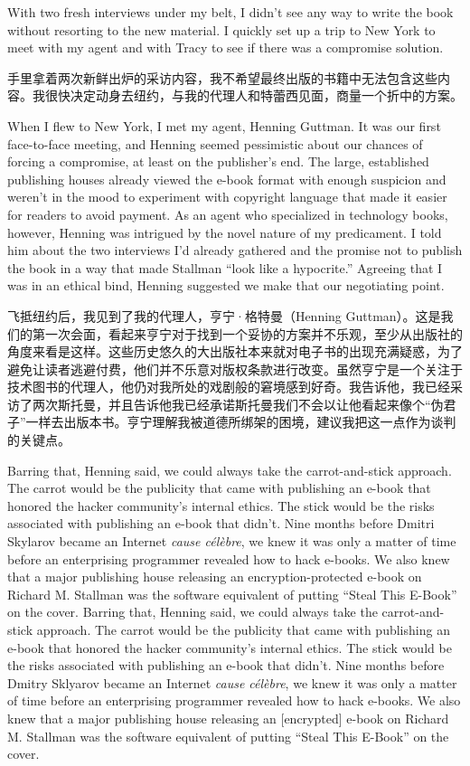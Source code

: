 \ifdefined\eng
With two fresh interviews under my belt, I didn't see any way to write the book without resorting to the new material. I quickly set up a trip to New York to meet with my agent and with Tracy to see if there was a compromise solution.
\fi

\ifdefined\chs
手里拿着两次新鲜出炉的采访内容，我不希望最终出版的书籍中无法包含这些内容。我很快决定动身去纽约，与我的代理人和特蕾西见面，商量一个折中的方案。
\fi

\ifdefined\eng
When I flew to New York, I met my agent, Henning Guttman. It was our first face-to-face meeting, and Henning seemed pessimistic about our chances of forcing a compromise, at least on the publisher's end. The large, established publishing houses already viewed the e-book format with enough suspicion and weren't in the mood to experiment with copyright language that made it easier for readers to avoid payment. As an agent who specialized in technology books, however, Henning was intrigued by the novel nature of my predicament. I told him about the two interviews I'd already gathered and the promise not to publish the book in a way that made Stallman ``look like a hypocrite.'' Agreeing that I was in an ethical bind, Henning suggested we make that our negotiating point.
\fi

\ifdefined\chs
飞抵纽约后，我见到了我的代理人，亨宁·格特曼（Henning Guttman）。这是我们的第一次会面，看起来亨宁对于找到一个妥协的方案并不乐观，至少从出版社的角度来看是这样。这些历史悠久的大出版社本来就对电子书的出现充满疑惑，为了避免让读者逃避付费，他们并不乐意对版权条款进行改变。虽然亨宁是一个关注于技术图书的代理人，他仍对我所处的戏剧般的窘境感到好奇。我告诉他，我已经采访了两次斯托曼，并且告诉他我已经承诺斯托曼我们不会以让他看起来像个``伪君子''一样去出版本书。亨宁理解我被道德所绑架的困境，建议我把这一点作为谈判的关键点。
\fi

\ifdefined\eng
\ifdefined\vone
Barring that, Henning said, we could always take the carrot-and-stick approach. The carrot would be the publicity that came with publishing an e-book that honored the hacker community's internal ethics. The stick would be the risks associated with publishing an e-book that didn't. Nine months before Dmitri Skylarov became an Internet \textit{cause célèbre}, we knew it was only a matter of time before an enterprising programmer revealed how to hack e-books. We also knew that a major publishing house releasing an encryption-protected e-book on Richard M. Stallman was the software equivalent of putting ``Steal This E-Book'' on the cover.
\fi
\ifdefined\vtwo
Barring that, Henning said, we could always take the carrot-and-stick approach. The carrot would be the publicity that came with publishing an e-book that honored the hacker community's internal ethics. The stick would be the risks associated with publishing an e-book that didn't. Nine months before Dmitry Sklyarov became an Internet \textit{cause célèbre}, we knew it was only a matter of time before an enterprising programmer revealed how to hack e-books. We also knew that a major publishing house releasing an [encrypted] e-book on Richard M. Stallman was the software equivalent of putting ``Steal This E-Book'' on the cover.
\fi
\fi

